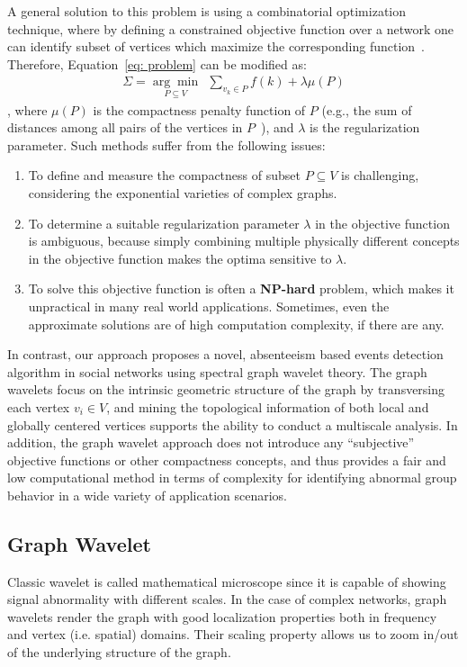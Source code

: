 A general solution to this problem is using a combinatorial optimization technique, where by defining a constrained objective function over a network one can identify subset of vertices which maximize the corresponding function~\cite{rozenshtein2014event}. Therefore, Equation~\ref{eq: problem} can be modified as:
\vspace{-0.5em}
\begin{eqnarray}
 \label{eq: problem_conventional}
    \Sigma=\underset{P\subseteq V}{\arg\min}\ \ \sum_{v_k\in P} {f(k)}+\lambda \mu(P)
\end{eqnarray}
, where $\mu(P)$ is the compactness penalty function of $P$ (e.g., the sum of distances among
all pairs of the vertices in $P$~\cite{rozenshtein2014event}), and $\lambda$ is the regularization parameter.
Such methods suffer from the following issues:
\begin{enumerate}
\item To define and measure the compactness of subset $P\subseteq V$ is challenging, considering the exponential varieties of complex graphs.
\item To determine a suitable regularization parameter $\lambda$ in the objective function is ambiguous, because simply combining multiple physically different concepts in the objective function makes the optima sensitive to $\lambda$.
\item To solve this objective function is often a \textbf{NP-hard} problem, which makes it unpractical in many real world applications. Sometimes, even the approximate solutions are of high computation complexity, if there are any.
\end{enumerate}

In contrast, our approach proposes a novel, absenteeism based events detection algorithm in social networks using spectral graph wavelet theory.
The graph wavelets focus on the intrinsic geometric structure of the graph by transversing each vertex $v_i\in V$, and mining the topological information of both local and globally centered vertices supports the ability to conduct a multiscale analysis.
In addition, the graph wavelet approach does not introduce any ``subjective'' objective functions or other compactness concepts, and thus provides a fair and low computational method in terms of complexity for identifying abnormal group behavior in a wide variety of application scenarios.

\subsection{Graph Wavelet}
Classic wavelet is called mathematical microscope since it is capable of showing signal abnormality with different scales. In the case of complex networks, graph wavelets render the graph with good localization properties both in frequency and vertex (i.e. spatial) domains. Their scaling property allows us to zoom in/out of the underlying structure of the graph.

